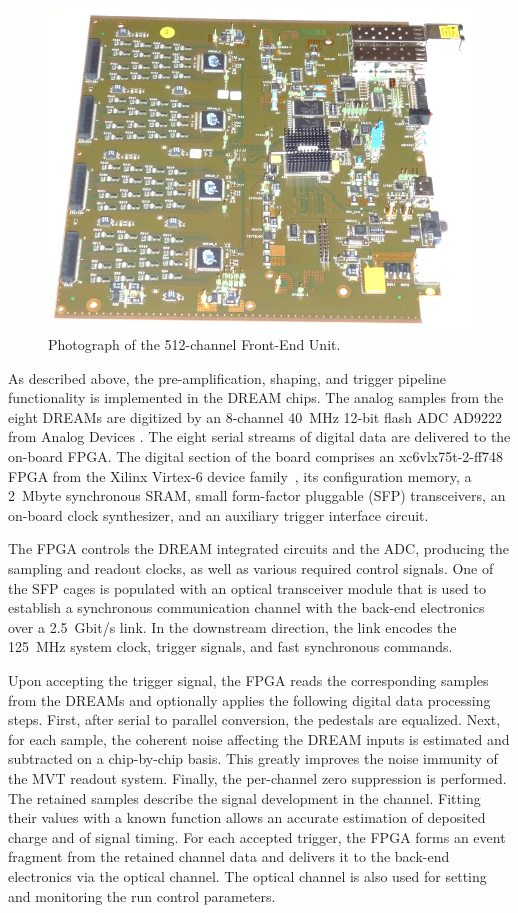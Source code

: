 \begin{figure}[htb]
 \includegraphics[width=1.0\columnwidth,keepaspectratio]{images/electronics_fig3.png}
 \caption{Photograph of the 512-channel Front-End Unit.}
 \label{fig:mm-e_3}
\end{figure}

As described above, the pre-amplification, shaping, and trigger pipeline functionality is implemented in the DREAM chips. The
analog samples from the eight DREAMs are digitized by an 8-channel 40~MHz 12-bit flash ADC AD9222 from Analog Devices
\cite{ADC}. The eight serial streams of digital data are delivered to the on-board FPGA. The digital section of the board
comprises an xc6vlx75t-2-ff748 FPGA from the Xilinx Virtex-6 device family~\cite{XIL}, its configuration memory, a 2~Mbyte
synchronous SRAM, small form-factor pluggable (SFP) transceivers, an on-board clock synthesizer, and an auxiliary trigger
interface circuit.

The FPGA controls the DREAM integrated circuits and the ADC, producing the sampling and readout clocks, as well as various
required control signals. One of the SFP cages is populated with an optical transceiver module that is used to establish a
synchronous communication channel with the back-end electronics over a 2.5~Gbit/s link. In the downstream direction, the link
encodes the 125~MHz system clock, trigger signals, and fast synchronous commands.

Upon accepting the trigger signal, the FPGA reads the corresponding samples from the DREAMs and optionally applies the
following digital data processing steps. First, after serial to parallel conversion, the pedestals are equalized. Next, for each
sample, the coherent noise affecting the DREAM inputs is estimated and subtracted on a chip-by-chip basis. This greatly
improves the noise immunity of the MVT readout system. Finally, the per-channel zero suppression is performed. The retained
samples describe the signal development in the channel. Fitting their values with a known function allows an accurate estimation of
deposited charge and of signal timing. For each accepted trigger, the FPGA forms an event fragment from the retained channel
data and delivers it to the back-end electronics via the optical channel. The optical channel is also used for setting and monitoring
the run control parameters.

